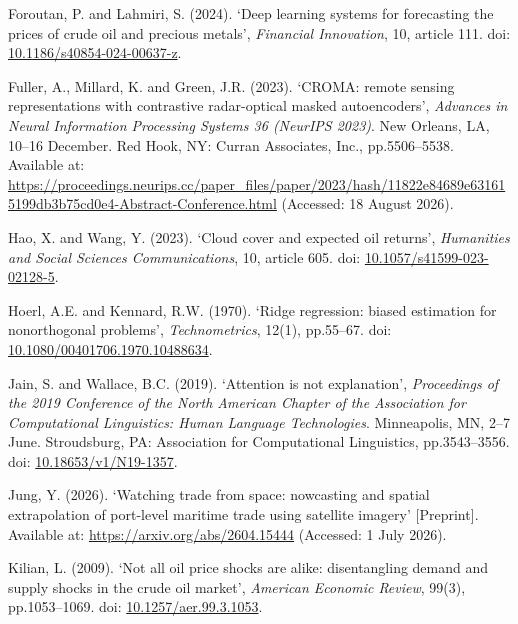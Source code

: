 \documentclass[
  british,
  12pt,
  oneside]{book}
\newlength{\cslhangindent}
\newenvironment{CSLReferences}[2] %
 {\begin{list}{}{%
  \setlength{\itemindent}{0pt}
  \setlength{\leftmargin}{0pt}
  \setlength{\parsep}{0pt}
  \ifodd #1
   \setlength{\leftmargin}{\cslhangindent}
   \setlength{\itemindent}{-1\cslhangindent}
  \fi
  \setlength{\itemsep}{#2\baselineskip}}}
 {\end{list}}
\begin{document}
\begin{CSLReferences}{0}{1}
Foroutan, P. and Lahmiri, S. (2024). {`{Deep learning systems for forecasting the prices of crude oil and precious metals}'}, \emph{Financial Innovation}, 10, article 111. doi: \href{https://doi.org/10.1186/s40854-024-00637-z}{10.1186/s40854-024-00637-z}.

Fuller, A., Millard, K. and Green, J.R. (2023). {`{{CROMA}: remote sensing representations with contrastive radar-optical masked autoencoders}'}, \emph{{Advances in Neural Information Processing Systems 36 ({NeurIPS} 2023)}}. New Orleans, LA, 10--16 December. Red Hook, NY: Curran Associates, Inc., pp.5506--5538. Available at: \url{https://proceedings.neurips.cc/paper_files/paper/2023/hash/11822e84689e631615199db3b75cd0e4-Abstract-Conference.html} (Accessed: 18 August 2026).

Hao, X. and Wang, Y. (2023). {`{Cloud cover and expected oil returns}'}, \emph{Humanities and Social Sciences Communications}, 10, article 605. doi: \href{https://doi.org/10.1057/s41599-023-02128-5}{10.1057/s41599-023-02128-5}.

Hoerl, A.E. and Kennard, R.W. (1970). {`{Ridge regression: biased estimation for nonorthogonal problems}'}, \emph{Technometrics}, 12(1), pp.55--67. doi: \href{https://doi.org/10.1080/00401706.1970.10488634}{10.1080/00401706.1970.10488634}.

Jain, S. and Wallace, B.C. (2019). {`{Attention is not explanation}'}, \emph{{Proceedings of the 2019 Conference of the North American Chapter of the Association for Computational Linguistics: Human Language Technologies}}. Minneapolis, MN, 2--7 June. Stroudsburg, PA: Association for Computational Linguistics, pp.3543--3556. doi: \href{https://doi.org/10.18653/v1/N19-1357}{10.18653/v1/N19-1357}.

Jung, Y. (2026). {`{Watching trade from space: nowcasting and spatial extrapolation of port-level maritime trade using satellite imagery}'} {[}Preprint{]}. Available at: \url{https://arxiv.org/abs/2604.15444} (Accessed: 1 July 2026).

Kilian, L. (2009). {`{Not all oil price shocks are alike: disentangling demand and supply shocks in the crude oil market}'}, \emph{American Economic Review}, 99(3), pp.1053--1069. doi: \href{https://doi.org/10.1257/aer.99.3.1053}{10.1257/aer.99.3.1053}.


\end{CSLReferences}
\end{document}
